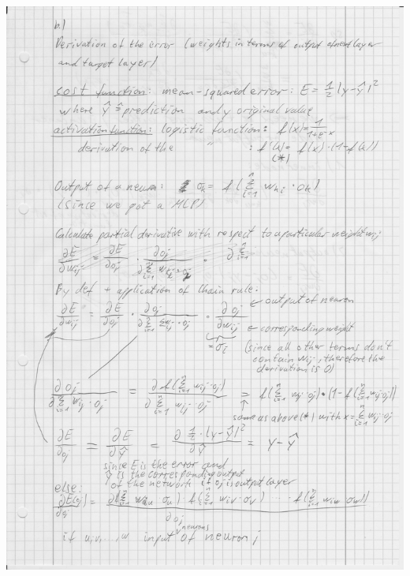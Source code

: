 \documentclass[12pt]{article}
\begin{document}
\begin{enumerate}[a)]
	\includegraphics[scale = 0.1]{pictures/SCN_0001-min.jpg}\\

\end{enumerate}
\end{document}
